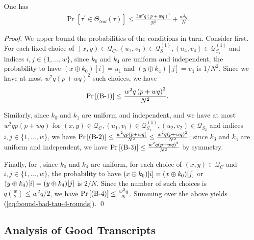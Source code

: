 \begin{lemma}
	\label{lemma:bad-tau-4-rounds}
	
	One has
	\begin{align}
	\operatorname{Pr}[\tau^{\prime} \in \Theta_{bad}(\tau)] \leq \frac{3w^{2} q \left(p+w q\right)^{2}}{N^{2}} + \frac{w^{2} q}{N}.
	\label{eq:bound-bad-tau-4-rounds}
	\end{align}
\end{lemma}
\begin{proof}
We upper bound the probabilities of the conditions in turn. Consider \bone first. For each fixed choice of $(x, y) \in \mathcal{Q}_{C}, \left(u_{1}, v_{1}\right) \in \mathcal{Q}_{S_{1}}^{(1)}, \left(u_{4}, v_{4}\right) \in \mathcal{Q}_{S_{4}}^{(1)}$ and indices $i, j \in \{1, \ldots, w\}$, since $k_{0}$ and $k_{4}$ are uniform and independent, the probability to have $(x \oplus k_{0})[i]=u_1$ and $(y \oplus k_{4})[j]=v_4$ is $1/N^2$. Since we have at most $w^{2} q \left(p+w q\right)^{2}$ such choices, we have
%
$$
\operatorname{Pr}\left[\text{(B-1)}\right] \leq \frac{w^{2} q \left(p+w q\right)^{2}}{N^{2}}.
$$
%

Similarly, since $k_{0}$ and $k_{1}$ are uniform and independent, and we have at most $w^{2} q p \left(p+w q\right)$ for $(x, y) \in \mathcal{Q}_{C}, \left(u_{1}, v_{1}\right) \in \mathcal{Q}_{S_{1}}^{(1)}, \left(u_{2}, v_{2}\right) \in \mathcal{Q}_{S_{2}}$ and indices $i, j \in \{1, \ldots, w\}$, we have $\operatorname{Pr}\left[\text{(B-2)}\right] \leq \frac{w^{2} q p \left(p+w q\right)}{N^{2}}\leq\frac{w^{2} q \left(p+w q\right)^{2}}{N^{2}}$; since $k_3$ and $k_4$ are uniform and independent, we have $\operatorname{Pr}\left[\text{(B-3)}\right] \leq \frac{w^{2} q \left(p+w q\right)^{2}}{N^{2}}$ by symmetry.


Finally, for \bfour, since $k_{0}$ and $k_{4}$ are uniform, for each choice of $(x,y) \in \mathcal{Q}_{C}$ and $i, j \in \{1, \ldots, w\}$, the probability to have $(x\oplus k_0)[i]=(x\oplus k_0)[j]$ or $(y\oplus k_4)[i]=(y\oplus k_4)[j]$ is $2/N$. Since the number of such choices is $q{w\choose 2}\leq w^2q/2$, we have $\operatorname{Pr}\left[\text{(B-4)}\right] \leq \frac{w^{2} q}{N}$. Summing over the above yields (\ref{eq:bound-bad-tau-4-rounds}).       \qed
\end{proof}






\subsection{Analysis of Good Transcripts}


